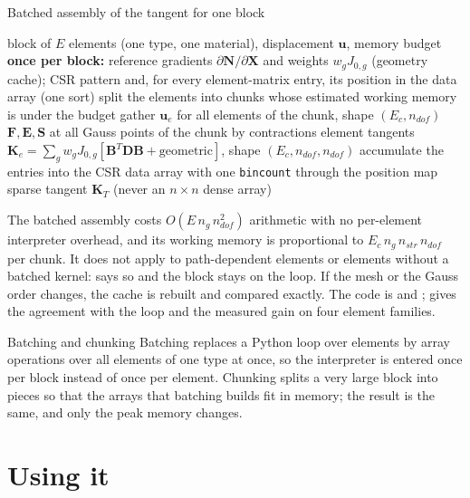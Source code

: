 \begin{algbox}{Batched assembly of the tangent for one block}
\begin{pseudo}
\Require block of $E$ elements (one type, one material), displacement $\bm u$, memory budget
\State \textbf{once per block:} reference gradients $\partial\bm N/\partial\bm X$ and weights $w_gJ_{0,g}$ (geometry cache); CSR pattern and, for every element-matrix entry, its position in the data array (one sort)
\State split the elements into chunks whose estimated working memory is under the budget
  \State gather $\bm u_e$ for all elements of the chunk, shape $(E_c,n_{dof})$
  \State $\bm F,\bm E,\bm S$ at all Gauss points of the chunk by contractions 
  \State element tangents $\bm K_e=\sum_g w_gJ_{0,g}[\bm B^T\bm D\bm B+\text{geometric}]$, shape $(E_c,n_{dof},n_{dof})$
  \State accumulate the entries into the CSR data array with one \texttt{bincount} through the position map
\EndFor
\Ensure sparse tangent $\bm K_T$ (never an $n\times n$ dense array)
\end{pseudo}
\end{algbox}

The batched assembly costs $O(E\,n_g\,n_{dof}^2)$ arithmetic with no per-element interpreter overhead, and its working memory is proportional to $E_c\,n_g\,n_{str}\,n_{dof}$ per chunk. It does not apply to path-dependent elements or elements without a batched kernel:  says so and the block stays on the loop. If the mesh or the Gauss order changes, the cache is rebuilt and compared exactly. The code is  and ;  gives the agreement with the loop and the measured gain on four element families.

\begin{sidenote}{Batching and chunking}
Batching replaces a Python loop over elements by array operations over all elements of one type at once, so the interpreter is entered once per block instead of once per element. Chunking splits a very large block into pieces so that the arrays that batching builds fit in memory; the result is the same, and only the peak memory changes.
\end{sidenote}

\section{Using it}\label{sec:bk-use}

